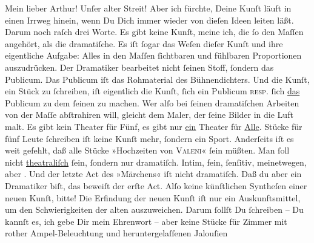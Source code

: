 \pstart\center{}Mein lieber Arthur!\pend\vspace{0.5em}
\pstart
           Unſer alter Streit! Aber ich fürchte, Deine Kunſt läuft in einen Irrweg hinein, wenn
               Du Dich immer wieder von dieſen Ideen leiten läßt. Darum noch raſch drei Worte. Es
               gibt keine Kunſt, meine ich, die ſo  den Maſſen angehört, als die dramatiſche. Es iſt ſogar das Weſen dieſer Kunſt
               und ihre eigentliche Aufgabe: Alles in den Maſſen ſichtbaren und fühlbaren
               Proportionen auszudrücken. Der Dramatiker bearbeitet nicht ſeinen Stoff, ſondern das
               Publicum. Das Publicum iſt das Rohmaterial des Bühnendichters. Und die Kunſt, ein
               Stück zu ſchreiben, iſt eigentlich die Kunſt, ſich ein Publicum \textsc{resp.} ſich \uline{das} Publicum {\pb}zu dem ſeinen zu machen. Wer alſo bei ſeinen
               dramatiſchen Arbeiten von der Maſſe abſtrahiren will, gleicht dem Maler, der ſeine
               Bilder in die Luft malt. Es gibt kein Theater für Fünf, es gibt nur \uline{ein} Theater für \uline{Alle}.
               Stücke für fünf Leute ſchreiben iſt keine Kunſt mehr, ſondern ein Sport. Anderſeits
               iſt es weit gefehlt, daß alle Stücke »Hochzeiten von
                     \textsc{Valeni}« ſein müßten. Man ſoll nicht \uline{theatraliſch} ſein,
               ſondern nur dramatiſch. Intim, fein, ſenſitiv, meinetwegen, aber . Und der letzte Act des »Märchens« iſt
               nicht dramatiſch. Daß du aber ein Dramatiker biſt, {\pb}das beweiſt der erſte Act. Alſo keine künſtlichen Syntheſen einer neuen Kunſt,
               bitte! Die Erfindung der neuen Kunſt iſt nur ein Auskunftsmittel, um den
               Schwierigkeiten der alten auszuweichen. Darum ſollſt Du ſchreiben – Du kannſt es, ich
               gebe Dir mein Ehrenwort – aber keine Stücke für Zimmer mit rother Ampel-Beleuchtung
               und heruntergelaſſenen Jalouſien{\dotsfive}\pend
           

